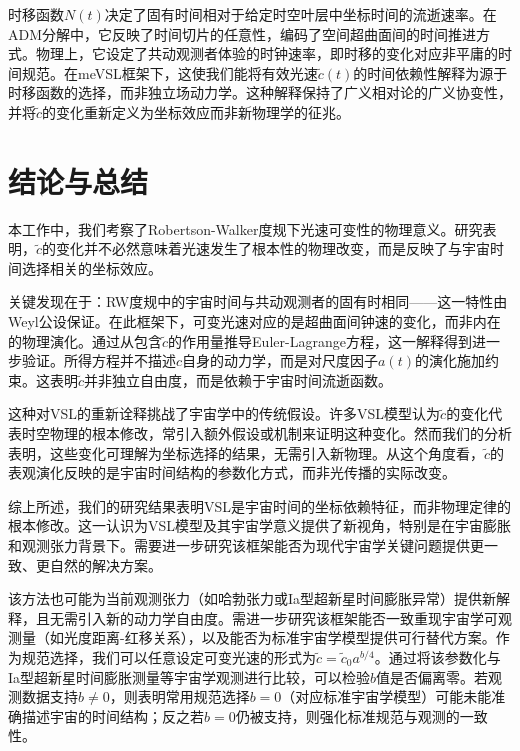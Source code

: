 \documentclass[jkps,preprint,fleqn]{revtex4}
\newcommand{\tc}{\tilde{c}}
\begin{document}
\begin{CJK*}{UTF8}{gbsn}
时移函数$N(t)$决定了固有时间相对于给定时空叶层中坐标时间的流逝速率。在ADM分解中，它反映了时间切片的任意性，编码了空间超曲面间的时间推进方式。物理上，它设定了共动观测者体验的时钟速率，即时移的变化对应非平庸的时间规范。在meVSL框架下，这使我们能将有效光速$\tc(t)$的时间依赖性解释为源于时移函数的选择，而非独立场动力学。这种解释保持了广义相对论的广义协变性，并将$\tc$的变化重新定义为坐标效应而非新物理学的征兆。
\section{结论与总结}\label{sec:Conc}
本工作中，我们考察了Robertson-Walker度规下光速可变性的物理意义。研究表明，$\tc$的变化并不必然意味着光速发生了根本性的物理改变，而是反映了与宇宙时间选择相关的坐标效应。

关键发现在于：RW度规中的宇宙时间与共动观测者的固有时相同——这一特性由Weyl公设保证。在此框架下，可变光速对应的是超曲面间钟速的变化，而非内在的物理演化。通过从包含$\tc$的作用量推导Euler-Lagrange方程，这一解释得到进一步验证。所得方程并不描述$c$自身的动力学，而是对尺度因子$a(t)$的演化施加约束。这表明$\tc$并非独立自由度，而是依赖于宇宙时间流逝函数。

这种对VSL的重新诠释挑战了宇宙学中的传统假设。许多VSL模型认为$\tc$的变化代表时空物理的根本修改，常引入额外假设或机制来证明这种变化。然而我们的分析表明，这些变化可理解为坐标选择的结果，无需引入新物理。从这个角度看，$\tc$的表观演化反映的是宇宙时间结构的参数化方式，而非光传播的实际改变。

综上所述，我们的研究结果表明VSL是宇宙时间的坐标依赖特征，而非物理定律的根本修改。这一认识为VSL模型及其宇宙学意义提供了新视角，特别是在宇宙膨胀和观测张力背景下。需要进一步研究该框架能否为现代宇宙学关键问题提供更一致、更自然的解决方案。

该方法也可能为当前观测张力（如哈勃张力或Ia型超新星时间膨胀异常）提供新解释，且无需引入新的动力学自由度。需进一步研究该框架能否一致重现宇宙学可观测量（如光度距离-红移关系），以及能否为标准宇宙学模型提供可行替代方案。作为规范选择，我们可以任意设定可变光速的形式为$\tc = \tc_0 a^{b/4}$。通过将该参数化与Ia型超新星时间膨胀测量等宇宙学观测进行比较，可以检验$b$值是否偏离零。若观测数据支持$b \neq 0$，则表明常用规范选择$b = 0$（对应标准宇宙学模型）可能未能准确描述宇宙的时间结构；反之若$b = 0$仍被支持，则强化标准规范与观测的一致性。


\end{CJK*}
\end{document}
